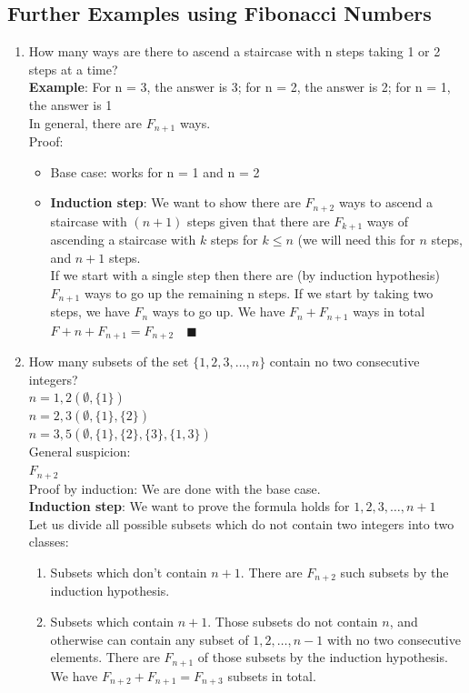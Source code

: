 \documentclass[9pt, letterpaper, oneside]{article}
\begin{document}
\subsection{Further Examples using Fibonacci Numbers}
\begin{enumerate}
\item How many ways are there to ascend a staircase with n steps taking 1 or 2 steps at a time?\\
\textbf{Example}: For n = 3, the answer is 3; for n = 2, the answer is 2; for n = 1, the answer is 1\\
In general, there are $F_{n+1}$ ways.\\
Proof: 
\begin{itemize}
\item Base case: works for n = 1 and n = 2
\item \textbf{Induction step}: We want to show there are $F_{n+2}$ ways to ascend a staircase with $(n+1)$ steps given that there are  $F_{k+1}$ ways of ascending a staircase with $k$ steps for $k \leq n$ (we will need this for $n$ steps, and $n+ 1$ steps.\\
If we start with a single step then there are (by induction hypothesis) $F_{n+1}$ ways to go up the remaining n steps. If we start by taking two steps, we have $F_n$ ways to go up. We have $F_n +F_{n+1}$ ways in total $F+n + F_{n+1} = F_{n+2} \quad \blacksquare$
\end{itemize}
\item How many subsets of the set $\{1,2,3,\ldots ,n\}$ contain no two consecutive integers?\\
$n = 1, 2 (\emptyset, \{1\})$\\
$n = 2, 3 (\emptyset, \{1\}, \{2\})$\\
$n = 3, 5 (\emptyset, \{1\}, \{2\}, \{3\}, \{1,3\})$\\
General suspicion:\\
$F_{n+2}$\\
Proof by induction: We are done with the base case.\\

\textbf{Induction step}: We want to prove the formula holds for ${1, 2, 3, \ldots, n + 1}$\\
Let us divide all possible subsets which do not contain two integers into two classes:\\
\begin{enumerate}
\item Subsets which don't contain $n + 1$. There are $F_{n+2}$ such subsets by the induction hypothesis. 
\item Subsets which contain $n + 1$. Those subsets do not contain $n$, and otherwise can contain any subset of ${1, 2, \ldots, n - 1}$ with no two consecutive elements. There are $F_{n+1}$ of those subsets by the induction hypothesis. We have $F_{n+2} + F_{n+1} = F_{n+3}$ subsets in total.
\end{enumerate}
\end{enumerate}
\end{document}
